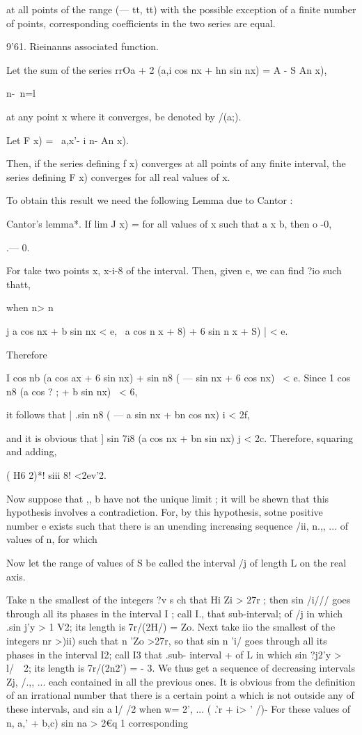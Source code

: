 at all points of the range (— tt, tt) with the possible exception of a
finite number of points, corresponding coefficients in the two series
are equal.

9'61. Rieinanns associated function.

Let the sum of the series rrOa + 2 (a,i cos nx + hn sin nx) = A - S An
x),

  n-\ n=l

at any point x where it converges, be denoted by /(a;).

Let F x) = \ a,x'- i n- An x).

Then, if the series defining f x) converges at all points of any
finite interval, the series defining F x) converges for all real
values of x.

To obtain this result we need the following Lemma due to Cantor :

Cantor's lemma*. If lim J x) = for all values of x such that a x b,
then o -0,

 .— 0.

For take two points x, x-i-8 of the interval. Then, given e, we can
find ?io such thatt,

when n> n

j a cos nx + b sin nx < e, \ a cos n x + 8) + 6 sin n x + S) | < e.

Therefore

I cos nb (a cos ax + 6 sin nx) + sin n8 ( — sin nx + 6 cos nx) \ < e.
Since 1 cos n8 (a cos ? ; + b sin nx) \ < 6,

it follows that | .sin n8 ( — a sin nx + bn cos nx) i < 2f,

and it is obvious that ] sin 7i8 (a cos nx + bn sin nx) j < 2c.
Therefore, squaring and adding,

( H6 2)*! siii 8! <2ev'2.

Now suppose that ,, b have not the unique limit ; it will be shewn
that this hypothesis involves a contradiction. For, by this
hypothesis, sotne positive number e exists such that there is an
unending increasing sequence /ii, n.,, ... of values of n, for which

Now let the range of values of S be called the interval /j of length L
on the real axis.

Take n the smallest of the integers ?v s ch that Hi Zi > 27r ; then
sin /i/// goes through all its phases in the interval I ; call I.,
that sub-interval; of /j in which .sin j'y > 1 V2; its length is
7r/(2H/) = Zo. Next take iio the smallest of the integers nr >)ii)
such that n 'Zo >27r, so that sin n 'i/ goes through all its phases in
the interval I2; call I3 that .sub- interval + of L in which sin ?j2'y
> l/\ \ 2; its length is 7r/(2n2') = - 3. We thus get a sequence of
decreasing intervals Zj, /.,, ... each contained in all the previous
ones. It is obvious from the definition of an irrational number that
there is a certain point a which is not outside any of these
intervals, and sin a l/ /2 when w= 2', ... ( .'r + i> ' /)- For these
values of n, a,' + b,c) sin na > 2€q 1%
corresponding

